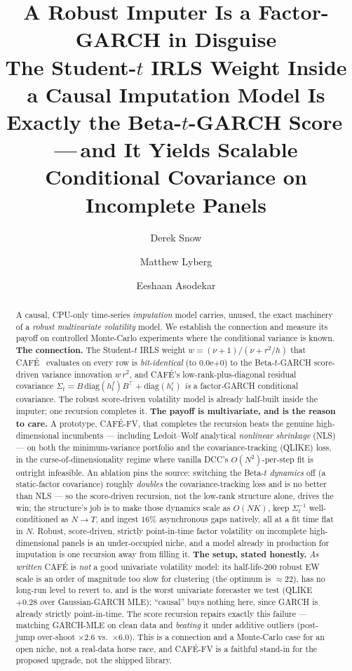 \documentclass[10pt,twocolumn]{article}
\title{\textbf{A Robust Imputer Is a Factor-GARCH in Disguise}\\[3pt]
  {\large\normalfont The Student-$t$ IRLS Weight Inside a Causal Imputation Model Is
   Exactly the Beta-$t$-GARCH Score\,---\,and It Yields Scalable Conditional
   Covariance on Incomplete Panels}}
\author[1]{Derek Snow}
\author[1]{Matthew Lyberg}
\author[1]{Eeshaan Asodekar}
\affil[1]{Sovai Research \quad \texttt{d.snow@sov.ai}}
\date{}
\newcommand{\cafe}{CAF\'E}
\newcommand{\fv}{\cafe{}-FV}
\begin{document}
\maketitle

\begin{abstract}
\noindent
A causal, CPU-only time-series \emph{imputation} model carries, unused, the exact
machinery of a \emph{robust multivariate volatility} model. We establish the
connection and measure its payoff on controlled Monte-Carlo experiments where the
conditional variance is known. \textbf{The connection.} The Student-$t$ IRLS weight
$w=(\nu{+}1)/(\nu{+}r^2/h)$ that \cafe~\cite{snow2025cafe} evaluates on every row is
\emph{bit-identical} (to $0.0$e$+$0) to the Beta-$t$-GARCH score-driven variance
innovation $w\,r^2$, and \cafe{}'s low-rank-plus-diagonal residual covariance
$\Sigma_t=B\,\mathrm{diag}(h^f_t)B^\top+\mathrm{diag}(h^\varepsilon_t)$ \emph{is} a
factor-GARCH conditional covariance. The robust score-driven volatility model is
already half-built inside the imputer; one recursion completes it.
\textbf{The payoff is multivariate, and is the reason to care.} A prototype, \fv{},
that completes the recursion beats the genuine high-dimensional incumbents --- including
Ledoit--Wolf analytical \emph{nonlinear shrinkage} (NLS) --- on both the minimum-variance
portfolio and the covariance-tracking (QLIKE) loss, in the curse-of-dimensionality regime
where vanilla DCC's $O(N^2)$-per-step fit is outright infeasible. An ablation pins the
source: switching the Beta-$t$ \emph{dynamics} off (a static-factor covariance) roughly
\emph{doubles} the covariance-tracking loss and is no better than NLS --- so the
score-driven recursion, not the low-rank structure alone, drives the win; the structure's
job is to make those dynamics scale as $O(NK)$, keep $\Sigma_t^{-1}$ well-conditioned as
$N\!\to\!T$, and ingest $16\%$ asynchronous gaps natively, all at a fit time flat in $N$.
Robust, score-driven, strictly point-in-time factor volatility on incomplete
high-dimensional panels is an under-occupied niche, and a model already in production for
imputation is one recursion away from filling it.
\textbf{The setup, stated honestly.} \emph{As written} \cafe{} is \emph{not} a good
univariate volatility model: its half-life-$200$ robust EW scale is an order of magnitude
too slow for clustering (the optimum is $\approx\!22$), has no long-run level to revert to,
and is the worst univariate forecaster we test (QLIKE $+0.28$ over Gaussian-GARCH MLE);
``causal'' buys nothing here, since GARCH is already strictly point-in-time. The score
recursion repairs exactly this failure --- matching GARCH-MLE on clean data and
\emph{beating} it under additive outliers (post-jump over-shoot $\times2.6$ vs.\
$\times6.0$). This is a connection and a Monte-Carlo case for an open niche, not a
real-data horse race, and \fv{} is a faithful stand-in for the proposed upgrade, not the
shipped library.
\end{abstract}
\end{document}
